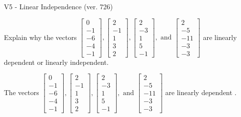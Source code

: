 \begin{exercise}
  \begin{exerciseTitle}V5 - Linear Independence (ver. 726)\end{exerciseTitle}
  \begin{exerciseStatement}
    Explain why the vectors \(\left[\begin{array}{r}
0 \\
-1 \\
-6 \\
-4 \\
-1
\end{array}\right] , \left[\begin{array}{r}
2 \\
-1 \\
1 \\
3 \\
2
\end{array}\right] , \left[\begin{array}{r}
2 \\
-3 \\
1 \\
5 \\
-1
\end{array}\right] , \text{ and } \left[\begin{array}{r}
2 \\
-5 \\
-11 \\
-3 \\
-3
\end{array}\right]\) are linearly dependent or linearly independent.	


  \end{exerciseStatement}
  \begin{exerciseAnswer}
   The vectors \(\left[\begin{array}{r}
0 \\
-1 \\
-6 \\
-4 \\
-1
\end{array}\right] , \left[\begin{array}{r}
2 \\
-1 \\
1 \\
3 \\
2
\end{array}\right] , \left[\begin{array}{r}
2 \\
-3 \\
1 \\
5 \\
-1
\end{array}\right] , \text{ and } \left[\begin{array}{r}
2 \\
-5 \\
-11 \\
-3 \\
-3
\end{array}\right]\) are 
  	 linearly dependent  .
  


  \end{exerciseAnswer}
\end{exercise}